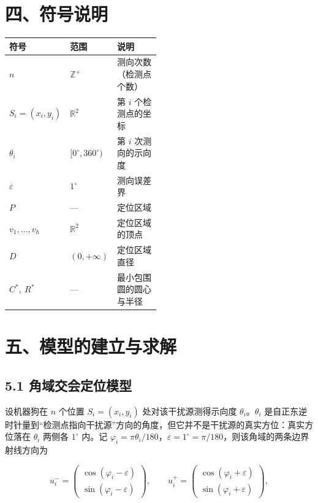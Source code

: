 \documentclass[UTF8,a4paper,zihao=-4,fontset=fandol]{ctexart}
\begin{document}
\section*{四、符号说明}

\begin{center}
\renewcommand{\arraystretch}{1.3}
\begin{tabularx}{0.98\linewidth}{>{\centering\arraybackslash}p{0.25\linewidth}>{\centering\arraybackslash}p{0.24\linewidth}>{\centering\arraybackslash}X}
\toprule
\textbf{符号} & \textbf{范围} & \textbf{说明} \\
\midrule
$n$ & $\mathbb{Z}^+$ & 测向次数（检测点个数） \\
$S_i=(x_i,y_i)$ & $\mathbb{R}^2$ & 第 $i$ 个检测点的坐标 \\
$\theta_i$ & $[0^\circ,360^\circ)$ & 第 $i$ 次测向的示向度 \\
$\varepsilon$ & $1^\circ$ & 测向误差界 \\
$P$ & --- & 定位区域 \\
$v_1,\dots,v_h$ & $\mathbb{R}^2$ & 定位区域的顶点 \\
$D$ & $(0,+\infty)$ & 定位区域直径 \\
$C^*,\ R^*$ & --- & 最小包围圆的圆心与半径 \\
\bottomrule
\end{tabularx}
\end{center}

\section*{五、模型的建立与求解}

\subsection*{5.1 角域交会定位模型}

设机器狗在 $n$ 个位置 $S_i=(x_i,y_i)$ 处对该干扰源测得示向度 $\theta_i$。$\theta_i$ 是自正东逆时针量到“检测点指向干扰源”方向的角度，但它并不是干扰源的真实方位：真实方位落在 $\theta_i$ 两侧各 $1^\circ$ 内。记 $\varphi_i=\pi\theta_i/180$，$\varepsilon=1^\circ=\pi/180$，则该角域的两条边界射线方向为

\[
u_i^-=\begin{pmatrix}\cos(\varphi_i-\varepsilon)\\ \sin(\varphi_i-\varepsilon)\end{pmatrix},\qquad
u_i^+=\begin{pmatrix}\cos(\varphi_i+\varepsilon)\\ \sin(\varphi_i+\varepsilon)\end{pmatrix},
\]
\end{document}
